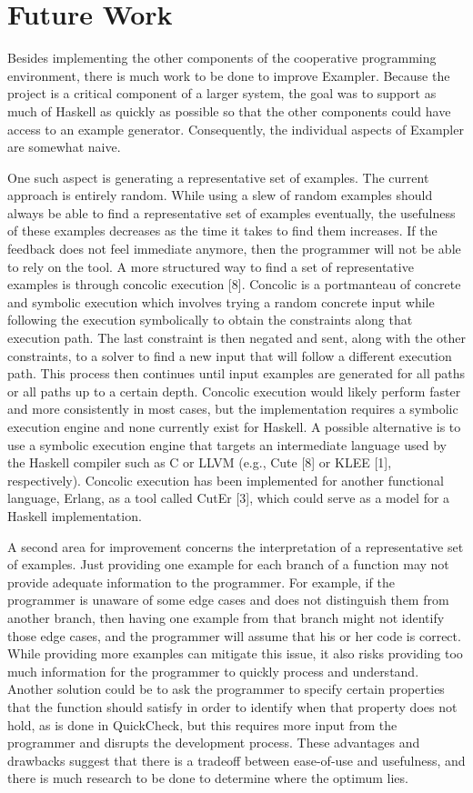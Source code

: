 \section{Future Work}
Besides implementing the other components of the cooperative programming environment, there is much work to be done to improve Exampler.
Because the project is a critical component of a larger system, the goal was to support as much of Haskell as quickly as possible so that the other components could have access to an example generator.
Consequently, the individual aspects of Exampler are somewhat naive.

One such aspect is generating a representative set of examples.
The current approach is entirely random.
While using a slew of random examples should always be able to find a representative set of examples eventually, the usefulness of these examples decreases as the time it takes to find them increases.
If the feedback does not feel immediate anymore, then the programmer will not be able to rely on the tool.
A more structured way to find a set of representative examples is through concolic execution [8].
Concolic is a portmanteau of concrete and symbolic execution which involves trying a random concrete input while following the execution symbolically to obtain the constraints along that execution path.
The last constraint is then negated and sent, along with the other constraints, to a solver to find a new input that will follow a different execution path.
This process then continues until input examples are generated for all paths or all paths up to a certain depth.
Concolic execution would likely perform faster and more consistently in most cases, but the implementation requires a symbolic execution engine and none currently exist for Haskell.
A possible alternative is to use a symbolic execution engine that targets an intermediate language used by the Haskell compiler such as C or LLVM (e.g., Cute [8] or KLEE [1], respectively).
Concolic execution has been implemented for another functional language, Erlang, as a tool called CutEr [3], which could serve as a model for a Haskell implementation.

A second area for improvement concerns the interpretation of a representative set of examples.
Just providing one example for each branch of a function may not provide adequate information to the programmer.
For example, if the programmer is unaware of some edge cases and does not distinguish them from another branch, then having one example from that branch might not identify those edge cases, and the programmer will assume that his or her code is correct.
While providing more examples can mitigate this issue, it also risks providing too much information for the programmer to quickly process and understand.
Another solution could be to ask the programmer to specify certain properties that the function should satisfy in order to identify when that property does not hold, as is done in QuickCheck, but this requires more input from the programmer and disrupts the development process.
These advantages and drawbacks suggest that there is a tradeoff between ease-of-use and usefulness, and there is much research to be done to determine where the optimum lies.


